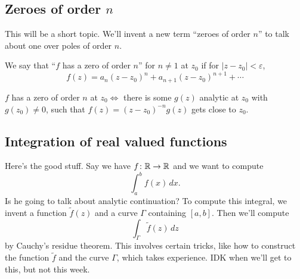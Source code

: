 \subsection{Zeroes of order $n$}
This will be a short topic. We'll invent a new term ``zeroes of order $n$'' to talk about one over poles of order $n$.
\begin{definition}[]
    We say that ``$f$ has a zero of order $n$'' for $n\neq 1$ at $z_0$ if for $|z-z_0|<\varepsilon $, \[
        f(z)=a_n (z-z_0)^n +a_{n+1}(z-z_0)^{n+1}+\cdots 
    \] 
\end{definition}
\begin{lemma}\label{zpol}
    $f$ has a zero of order $n$ at $z_0\iff$ there is some $g(z)$ analytic at $ z_0$ with $g(z_0)\neq 0$, such that $f(z)=(z-z_0)^{-n}g(z)$ gets close to $z_0$.
\end{lemma}
\subsection{Integration of real valued functions}
Here's the good stuff. Say we have $f\colon \mathbb{R} \to \mathbb{R}$ and we want to compute \[
    \int_{a}^{b} f(x) \, dx.
\] Is he going to talk about analytic continuation? To compute this integral, we invent a function $\widetilde f(z)$ and a curve $\Gamma $ containing $[a,b]$. Then we'll compute \[
\int_{\Gamma }^{} \widetilde f(z) \, dz
\] by Cauchy's residue theorem. This involves certain tricks, like how to construct the function $\widetilde f$ and the curve $\Gamma $, which takes experience. IDK when we'll get to this, but not this week. 

